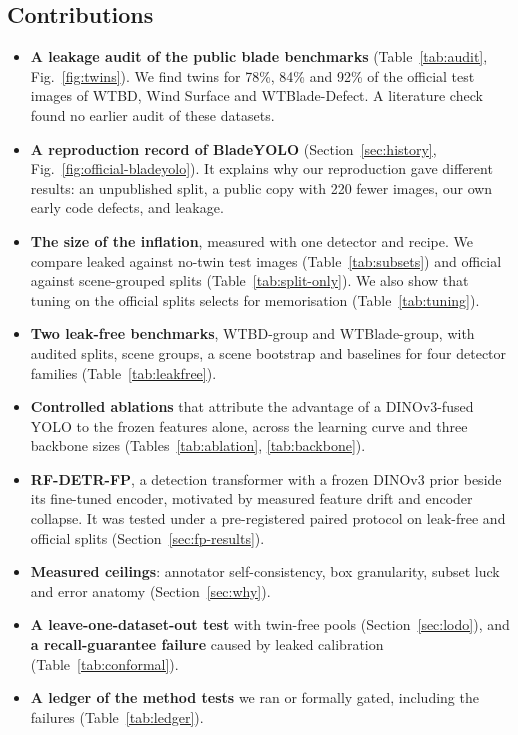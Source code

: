 \subsection{Contributions}
\begin{itemize}
\item \textbf{A leakage audit of the public blade benchmarks} (Table~\ref{tab:audit}, Fig.~\ref{fig:twins}). We find twins for 78\%, 84\% and 92\% of the official test images of WTBD, Wind Surface and WTBlade-Defect. A literature check found no earlier audit of these datasets.
\item \textbf{A reproduction record of BladeYOLO} (Section~\ref{sec:history}, Fig.~\ref{fig:official-bladeyolo}). It explains why our reproduction gave different results: an unpublished split, a public copy with 220 fewer images, our own early code defects, and leakage.
\item \textbf{The size of the inflation}, measured with one detector and recipe. We compare leaked against no-twin test images (Table~\ref{tab:subsets}) and official against scene-grouped splits (Table~\ref{tab:split-only}). We also show that tuning on the official splits selects for memorisation (Table~\ref{tab:tuning}).
\item \textbf{Two leak-free benchmarks}, WTBD-group and WTBlade-group, with audited splits, scene groups, a scene bootstrap and baselines for four detector families (Table~\ref{tab:leakfree}).
\item \textbf{Controlled ablations} that attribute the advantage of a DINOv3-fused YOLO to the frozen features alone, across the learning curve and three backbone sizes (Tables~\ref{tab:ablation}, \ref{tab:backbone}).
\item \textbf{RF-DETR-FP}, a detection transformer with a frozen DINOv3 prior beside its fine-tuned encoder, motivated by measured feature drift and encoder collapse. It was tested under a pre-registered paired protocol on leak-free and official splits (Section~\ref{sec:fp-results}).
\item \textbf{Measured ceilings}: annotator self-consistency, box granularity, subset luck and error anatomy (Section~\ref{sec:why}).
\item \textbf{A leave-one-dataset-out test} with twin-free pools (Section~\ref{sec:lodo}), and \textbf{a recall-guarantee failure} caused by leaked calibration (Table~\ref{tab:conformal}).
\item \textbf{A ledger of the method tests} we ran or formally gated, including the failures (Table~\ref{tab:ledger}).
\end{itemize}

